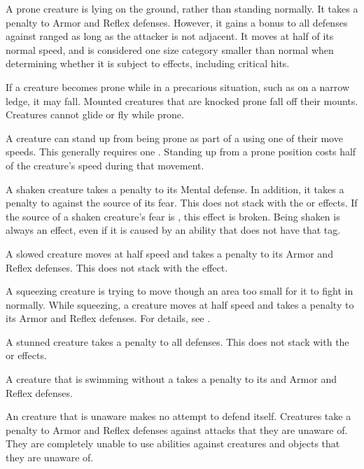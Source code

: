      A prone creature is lying on the ground, rather than standing normally.
    It takes a  penalty to Armor and Reflex defenses.
    However, it gains a  bonus to all defenses against ranged  as long as the attacker is not adjacent.
    It moves at half of its normal speed, and is considered one size category smaller than normal when determining whether it is subject to  effects, including critical hits.

    If a creature becomes prone while in a precarious situation, such as on a narrow ledge, it may fall.
    Mounted creatures that are knocked prone fall off their mounts.
    Creatures cannot glide or fly while prone.

    A creature can stand up from being prone as part of a  using one of their move speeds.
    This generally requires one .
    Standing up from a prone position costs half of the creature's speed during that movement.

     A shaken creature takes a  penalty to its Mental defense.
    In addition, it takes a  penalty to  against the source of its fear.
    This does not stack with the \frightened or \panicked effects.
    If the source of a shaken creature's fear is , this effect is broken.
    Being shaken is always an  effect, even if it is caused by an ability that does not have that tag.

     A slowed creature moves at half speed and takes a  penalty to its Armor and Reflex defenses.
    This does not stack with the \immobilized effect.

     A squeezing creature is trying to move though an area too small for it to fight in normally.
    While squeezing, a creature moves at half speed and takes a  penalty to its Armor and Reflex defenses.
    For details, see .

     A stunned creature takes a  penalty to all defenses.
    This does not stack with the \dazed or \confused effects.

     A creature that is swimming without a  takes a  penalty to its  and Armor and Reflex defenses.

     An creature that is unaware makes no attempt to defend itself.
    Creatures take a  penalty to Armor and Reflex defenses against attacks that they are unaware of.
    They are completely unable to use  abilities against creatures and objects that they are unaware of.


